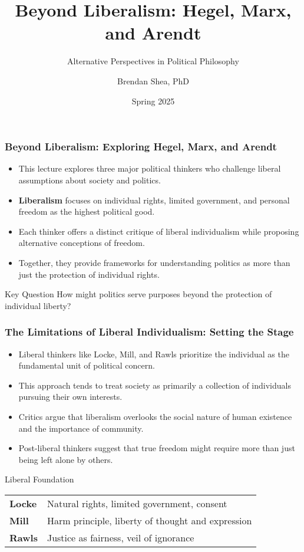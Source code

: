 \documentclass{beamer}
\title{Beyond Liberalism: Hegel, Marx, and Arendt}
\subtitle{Alternative Perspectives in Political Philosophy}
\author{Brendan Shea, PhD}
\date{Spring 2025}
\begin{document}
\begin{frame}
\titlepage
\end{frame}

\begin{frame}
\frametitle{Beyond Liberalism: Exploring Hegel, Marx, and Arendt}
\begin{itemize}
    \item This lecture explores three major political thinkers who challenge liberal assumptions about society and politics.
    \item \textbf{Liberalism} focuses on individual rights, limited government, and personal freedom as the highest political good.
    \item Each thinker offers a distinct critique of liberal individualism while proposing alternative conceptions of freedom.
    \item Together, they provide frameworks for understanding politics as more than just the protection of individual rights.
\end{itemize}

\begin{alertblock}{Key Question}
How might politics serve purposes beyond the protection of individual liberty?
\end{alertblock}
\end{frame}

\begin{frame}
\frametitle{The Limitations of Liberal Individualism: Setting the Stage}
\begin{itemize}
    \item Liberal thinkers like Locke, Mill, and Rawls prioritize the individual as the fundamental unit of political concern.
    \item This approach tends to treat society as primarily a collection of individuals pursuing their own interests.
    \item Critics argue that liberalism overlooks the social nature of human existence and the importance of community.
    \item Post-liberal thinkers suggest that true freedom might require more than just being left alone by others.
\end{itemize}

\begin{exampleblock}{Liberal Foundation}
\begin{tabular}{ll}
\textbf{Locke} & Natural rights, limited government, consent \\
\textbf{Mill} & Harm principle, liberty of thought and expression \\
\textbf{Rawls} & Justice as fairness, veil of ignorance \\
\end{tabular}
\end{exampleblock}
\end{frame}
\end{document}
